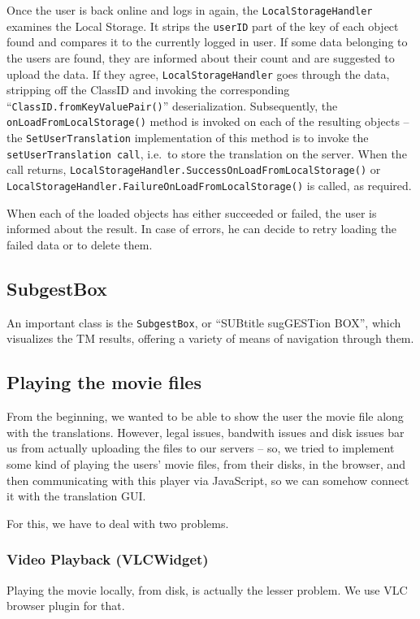 Once the user is back online and logs in again, the {\tt LocalStorageHandler} examines the Local Storage. It strips the {\tt userID} part of the key of each object found and compares it to the currently logged in user. If some data belonging to the users are found, they are informed about their count and are suggested to upload the data. If they agree, {\tt LocalStorageHandler} goes through the data, stripping off the ClassID and invoking the corresponding ``{\tt ClassID.fromKeyValuePair()}'' deserialization. Subsequently, the {\tt onLoadFromLocalStorage()} method is invoked on each of the resulting objects -- the {\tt SetUserTranslation} implementation of this method is to invoke the {\tt setUserTranslation call}, i.e.\ to store the translation on the server. When the call returns, {\tt LocalStorageHandler.SuccessOnLoadFromLocalStorage()} or {\tt LocalStorageHandler.FailureOnLoadFromLocalStorage()} is called, as required.

When each of the loaded objects has either succeeded or failed, the user is informed about the result. In case of errors, he can decide to retry loading the failed data or to delete them.

\subsection{SubgestBox}

An important class is the {\tt SubgestBox}, or ``SUBtitle sugGESTion BOX'', which visualizes the TM results, offering a variety of means of navigation through them.

\subsection{Playing the movie files}

From the beginning, we wanted to be able to show the user the movie file along with the translations. However, legal issues, bandwith issues and disk issues bar us from actually uploading the files to our servers -- so, we tried to implement some kind of playing the users' movie files, from their disks, in the browser, and then communicating with this player via JavaScript, so we can somehow connect it with the translation GUI.

For this, we have to deal with two problems.

\subsubsection*{Video Playback (VLCWidget)}
Playing the movie locally, from disk, is actually the lesser problem. We use VLC browser plugin for that.

